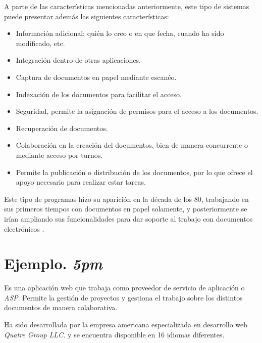 \documentclass[11pt,a4paper,spanish,twoside]{report}
\begin{document}
A parte de las características mencionadas anteriormente, este tipo de
sistemas puede presentar además las siguientes características:
\begin{itemize}
    \item Información adicional: quién lo creo o en que fecha, cuando ha sido
    modificado, etc. 
    \item Integración dentro de otras aplicaciones.
    \item Captura de documentos en papel mediante escanéo.
    \item Indexación de los documentos para facilitar el acceso.
    \item Seguridad, permite la asignación de permisos para el acceso a los
      documentos.
    \item Recuperación de documentos.
    \item Colaboración en la creación del documentos, bien de manera
      concurrente o mediante acceso por turnos.
    \item Permite la publicación o distribución de los documentos, por lo que
      ofrece el apoyo necesario para realizar estar tareas.
\end{itemize}

Este tipo de programas hizo su aparición en la década de los 80, trabajando
en sus primeros tiempos con documentos en papel solamente, y posteriormente
se irían ampliando sus funcionalidades para dar soporte al trabajo con
documentos electrónicos \cite{DMS}.

\section{Ejemplo. \emph{5pm}}

Es una aplicación web que trabaja como proveedor de servicio de aplicación o
\emph{ASP}. Permite la gestión de proyectos y gestiona el trabajo sobre los
distintos documentos de manera colaborativa.

Ha sido desarrollada por la empresa americana especializada en desarrollo web
\emph{Quatre Group LLC.} y se encuentra disponible en 16 idiomas diferentes.
\end{document}
